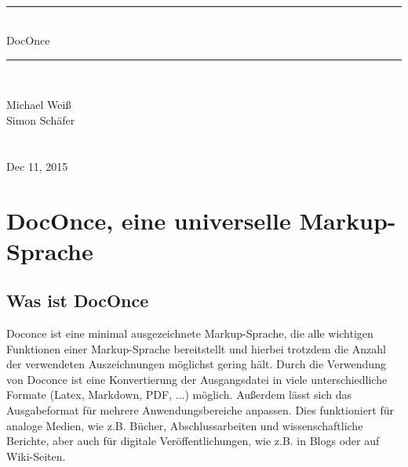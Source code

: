 \documentclass[%
oneside,                 %
final,                   %
chapterprefix=true,      %
open=right,              %
10pt]{book}
\begin{document}






\thispagestyle{empty}
\hbox{\ \ }
\vfill
\begin{center}
{\huge{\bfseries{
\begin{spacing}{1.25}
{\rule{\linewidth}{0.5mm}} \\[0.4cm]
{DocOnce}
\\[0.4cm] {\rule{\linewidth}{0.5mm}} \\[1.5cm]
\end{spacing}
}}}


\vspace{0.5cm}

{\Large\textsf{Michael Weiß${}^{}$}}\\ [3mm]

{\Large\textsf{Simon Schäfer${}^{}$}}\\ [3mm]

\ \\ [2mm]


\ \\ [10mm]
{\large\textsf{Dec 11, 2015}}

\end{center}
\vfill
\clearpage

\tableofcontents


\vspace{1cm} %




\chapter{DocOnce, eine universelle Markup-Sprache}
\section{Was ist DocOnce}
Doconce ist eine minimal ausgezeichnete Markup-Sprache, die alle wichtigen Funktionen einer Markup-Sprache bereitstellt und hierbei trotzdem die Anzahl der verwendeten Auszeichnungen möglichst gering hält. Durch die Verwendung von Doconce ist eine Konvertierung der Ausgangsdatei in viele unterschiedliche Formate (Latex, Markdown, PDF, ...) möglich. Außerdem lässt sich das Ausgabeformat für mehrere Anwendungsbereiche anpassen. Dies funktioniert für analoge Medien, wie z.B. Bücher, Abschlussarbeiten und wissenschaftliche Berichte, aber auch für digitale Veröffentlichungen, wie z.B. in Blogs oder auf Wiki-Seiten.
\end{document}
